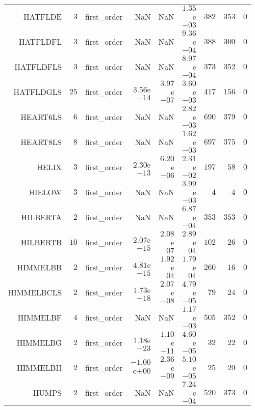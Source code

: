 \begin{longtable}{rrrrrrrrr}
HATFLDE & \(     3\) & first\_order &       NaN &       NaN & \( 1.35\)e\(-03\) & \(   382\) & \(   353\) & \(     0\) \\
HATFLDFL & \(     3\) & first\_order &       NaN &       NaN & \( 9.36\)e\(-04\) & \(   388\) & \(   300\) & \(     0\) \\
HATFLDFLS & \(     3\) & first\_order &       NaN &       NaN & \( 8.97\)e\(-04\) & \(   373\) & \(   352\) & \(     0\) \\
HATFLDGLS & \(    25\) & first\_order & \( 3.56\)e\(-14\) & \( 3.97\)e\(-07\) & \( 3.60\)e\(-03\) & \(   417\) & \(   156\) & \(     0\) \\
HEART6LS & \(     6\) & first\_order &       NaN &       NaN & \( 2.82\)e\(-03\) & \(   690\) & \(   379\) & \(     0\) \\
HEART8LS & \(     8\) & first\_order &       NaN &       NaN & \( 1.62\)e\(-03\) & \(   697\) & \(   375\) & \(     0\) \\
HELIX & \(     3\) & first\_order & \( 2.30\)e\(-13\) & \( 6.20\)e\(-06\) & \( 2.31\)e\(-02\) & \(   197\) & \(    58\) & \(     0\) \\
HIELOW & \(     3\) & first\_order &       NaN &       NaN & \( 3.99\)e\(-03\) & \(     4\) & \(     4\) & \(     0\) \\
HILBERTA & \(     2\) & first\_order &       NaN &       NaN & \( 6.87\)e\(-04\) & \(   353\) & \(   353\) & \(     0\) \\
HILBERTB & \(    10\) & first\_order & \( 2.07\)e\(-15\) & \( 2.08\)e\(-07\) & \( 2.89\)e\(-04\) & \(   102\) & \(    26\) & \(     0\) \\
HIMMELBB & \(     2\) & first\_order & \( 4.81\)e\(-15\) & \( 1.92\)e\(-04\) & \( 1.79\)e\(-04\) & \(   260\) & \(    16\) & \(     0\) \\
HIMMELBCLS & \(     2\) & first\_order & \( 1.73\)e\(-18\) & \( 2.07\)e\(-08\) & \( 4.79\)e\(-05\) & \(    79\) & \(    24\) & \(     0\) \\
HIMMELBF & \(     4\) & first\_order &       NaN &       NaN & \( 1.17\)e\(-03\) & \(   505\) & \(   352\) & \(     0\) \\
HIMMELBG & \(     2\) & first\_order & \( 1.18\)e\(-23\) & \( 1.10\)e\(-11\) & \( 4.60\)e\(-05\) & \(    32\) & \(    22\) & \(     0\) \\
HIMMELBH & \(     2\) & first\_order & \(-1.00\)e\(+00\) & \( 2.36\)e\(-09\) & \( 5.10\)e\(-05\) & \(    25\) & \(    20\) & \(     0\) \\
HUMPS & \(     2\) & first\_order &       NaN &       NaN & \( 7.24\)e\(-04\) & \(   520\) & \(   373\) & \(     0\) \\

\end{longtable}
